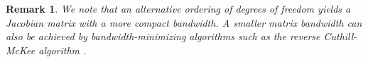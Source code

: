 \documentclass{article}
\newtheorem*{remark}{Remark}
\newcommand{\diag}[1]{{\rm diag}\LRp{#1}}
\newcommand{\td}[2]{\frac{{\rm d}#1}{{\rm d}{ {#2}}}}
\newcommand{\LRp}[1]{\left( #1 \right)}
\newcommand{\eq}[1]{\begin{align*}#1\end{align*}}
\newcommand{\eqlab}[1]{\begin{align}#1\end{align}}
\newcommand{\bmat}[1]{\begin{bmatrix}#1\end{bmatrix}}
\begin{document}
\begin{remark}
We note that an alternative ordering of degrees of freedom \cite{crean2018entropy} yields a Jacobian matrix with a more compact bandwidth.   A smaller matrix bandwidth can also be achieved by bandwidth-minimizing algorithms such as the reverse Cuthill-McKee algorithm \cite{cuthill1969reducing}.
\end{remark}


\end{document}
